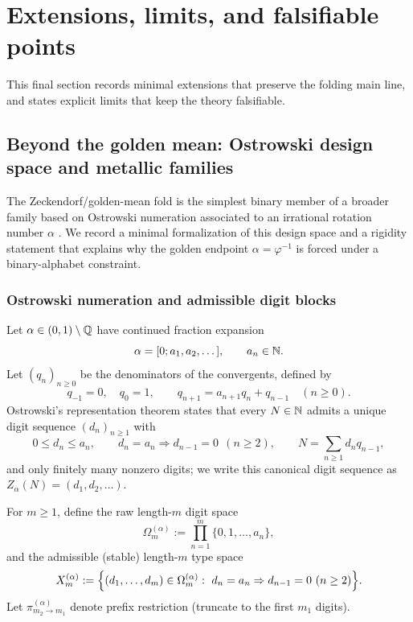 \section{Extensions, limits, and falsifiable points}\label{sec:extensions}

This final section records minimal extensions that preserve the folding main line, and states explicit limits that keep the theory falsifiable.

\subsection{Beyond the golden mean: Ostrowski design space and metallic families}\label{subsec:extensions-ostrowski}
The Zeckendorf/golden-mean fold is the simplest binary member of a broader family based on Ostrowski numeration associated to an irrational rotation number $\alpha$ \cite{Ostrowski1922,Berthe2001Ostrowski,HieronymiTerry2018OstrowskiAddition}.
We record a minimal formalization of this design space and a rigidity statement that explains why the golden endpoint $\alpha=\varphi^{-1}$ is forced under a binary-alphabet constraint.

\subsubsection{Ostrowski numeration and admissible digit blocks}
Let $\alpha\in(0,1)\setminus\mathbb{Q}$ have continued fraction expansion
\[
\alpha=[0;a_1,a_2,\dots],\qquad a_n\in\mathbb{N}.
\]
Let $(q_n)_{n\ge 0}$ be the denominators of the convergents, defined by
\[
q_{-1}=0,\quad q_0=1,\qquad q_{n+1}=a_{n+1}q_n+q_{n-1}\quad(n\ge 0).
\]
Ostrowski's representation theorem states that every $N\in\mathbb{N}$ admits a unique digit sequence $(d_n)_{n\ge 1}$ with
\[
0\le d_n\le a_n,\qquad d_n=a_n\Rightarrow d_{n-1}=0\ \ (n\ge 2),
\qquad
N=\sum_{n\ge 1} d_n q_{n-1},
\]
and only finitely many nonzero digits; we write this canonical digit sequence as $Z_\alpha(N)=(d_1,d_2,\dots)$.

\begin{definition}\label{def:ostrowski-omega-Xm}
For $m\ge 1$, define the raw length-$m$ digit space
\[
\Omega_m^{(\alpha)}:=\prod_{n=1}^{m}\{0,1,\dots,a_n\},
\]
and the admissible (stable) length-$m$ type space
\[
X_m^{(\alpha)}:=\Bigl\{(d_1,\dots,d_m)\in \Omega_m^{(\alpha)}:\ d_n=a_n\Rightarrow d_{n-1}=0\ (n\ge 2)\Bigr\}.
\]
Let $\pi^{(\alpha)}_{m_2\to m_1}$ denote prefix restriction (truncate to the first $m_1$ digits).
\end{definition}


